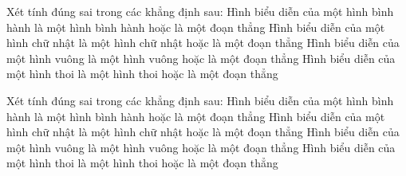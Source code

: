 \begin{ex}%
	Xét tính đúng sai trong các  khẳng định sau:
	\choiceTF 
		{\True Hình  biểu diễn của một hình bình hành là một hình bình hành hoặc là một đoạn thẳng}
		{Hình biểu diễn  của một hình chữ nhật là một hình chữ nhật hoặc là một đoạn thẳng}
		{Hình biểu diễn của một hình vuông là một  hình vuông hoặc là một đoạn thẳng}
		{Hình biểu diễn của một hình thoi là một  hình thoi hoặc là một đoạn thẳng}
\end{ex}

\begin{ex}%
	 Xét tính đúng sai trong các khẳng định sau:
	 \choiceTF
		{\True Hình biểu diễn của một hình bình hành là một hình bình hành hoặc  là một đoạn thẳng}
		{Hình biểu diễn của một hình chữ nhật là một hình chữ nhật hoặc là một  đoạn thẳng}
		{Hình biểu diễn của một  hình vuông là một hình vuông hoặc là một đoạn thẳng}
		{Hình biểu diễn của một hình thoi là  một hình thoi hoặc là một đoạn thẳng}
\end{ex}

